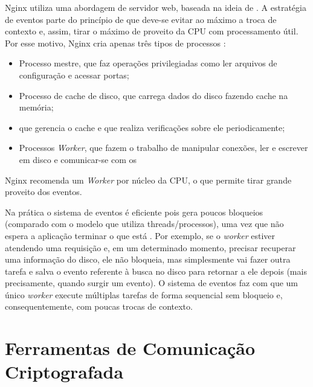 Nginx utiliza uma  abordagem de servidor web, baseada na ideia de .
A estratégia de eventos parte do princípio de que deve-se evitar ao máximo a troca
de contexto e, assim, tirar o máximo de proveito da CPU com processamento útil.
Por esse motivo, Nginx cria apenas três tipos de processos
\citep{nginx_architecture}:

\begin{itemize}
  \item Processo mestre, que faz operações privilegiadas como ler arquivos de configuração e acessar portas;
  \item Processo de cache de disco, que carrega dados do disco fazendo cache na memória;
  \item {} que gerencia o cache e que realiza verificações sobre ele periodicamente;
  \item Processos \textit{Worker}, que fazem o trabalho de manipular conexões, ler e escrever em disco e comunicar-se com os 
\end{itemize}

Nginx recomenda um \textit{Worker} por núcleo da CPU, o que permite tirar
grande proveito dos eventos.

Na prática o sistema de eventos é eficiente pois gera poucos bloqueios
(comparado com o modelo que utiliza threads/processos), uma vez que não
espera a aplicação terminar o que está . Por exemplo, se o
\textit{worker} estiver atendendo uma requisição e, em um determinado momento,
precisar recuperar uma informação do disco, ele não bloqueia, mas
simplesmente vai fazer outra tarefa e salva o evento referente à busca no disco
para retornar a ele depois (mais precisamente, quando surgir um evento). O
sistema de eventos faz com que um único \textit{worker} execute múltiplas
tarefas de forma sequencial sem bloqueio e, consequentemente, com poucas trocas
de contexto.

\section{Ferramentas de Comunicação Criptografada}
\label{sec:com_enc}

